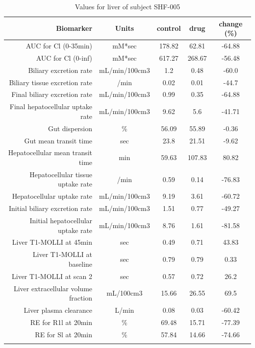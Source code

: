 \documentclass{epflreport}%
\begin{document}
%
\clearpage%
\begin{longtable}{rcccc}%
\hline%
Biomarker&Units&control&drug&change (\%)\\%
\hline%
AUC for Cl (0{-}35min)&mM*sec&178.82&62.81&{-}64.88\\%
AUC for Cl (0{-}inf)&mM*sec&617.27&268.67&{-}56.48\\%
Biliary excretion rate&mL/min/100cm3&1.2&0.48&{-}60.0\\%
Biliary tissue excretion rate&/min&0.02&0.01&{-}44.7\\%
Final biliary excretion rate&mL/min/100cm3&0.99&0.35&{-}64.88\\%
Final hepatocellular uptake rate&mL/min/100cm3&9.62&5.6&{-}41.71\\%
Gut dispersion&\%&56.09&55.89&{-}0.36\\%
Gut mean transit time&sec&23.8&21.51&{-}9.62\\%
Hepatocellular mean transit time&min&59.63&107.83&80.82\\%
Hepatocellular tissue uptake rate&/min&0.59&0.14&{-}76.83\\%
Hepatocellular uptake rate&mL/min/100cm3&9.19&3.61&{-}60.72\\%
Initial biliary excretion rate&mL/min/100cm3&1.51&0.77&{-}49.27\\%
Initial hepatocellular uptake rate&mL/min/100cm3&8.76&1.61&{-}81.58\\%
Liver T1{-}MOLLI at 45min&sec&0.49&0.71&43.83\\%
Liver T1{-}MOLLI at baseline&sec&0.79&0.79&0.33\\%
Liver T1{-}MOLLI at scan 2&sec&0.57&0.72&26.2\\%
Liver extracellular volume fraction&mL/100cm3&15.66&26.55&69.5\\%
Liver plasma clearance&L/min&0.08&0.03&{-}60.42\\%
RE for R1l at 20min&\%&69.48&15.71&{-}77.39\\%
RE for Sl at 20min&\%&57.84&14.66&{-}74.66\\%
\hline%
\caption{Values for liver of subject SHF-005} \\%
\end{longtable}%
\end{document}
